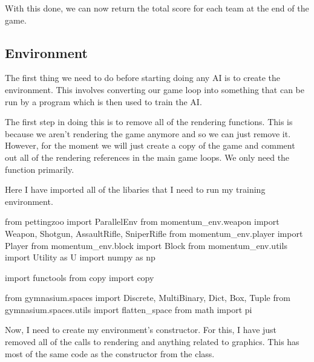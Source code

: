 \vs
With this done, we can now return the total score for each team at the end of the game.


\subsection{Environment}

The first thing we need to do before starting doing any AI is to create the environment. This involves converting our game loop into something that can be run by a program which is then used to train the AI.

\vs
The first step in doing this is to remove all of the rendering functions. This is because we aren't rendering the game anymore and so we can just remove it. However, for the moment we will just create a copy of the game and comment out all of the rendering references in the main game loops. We only need the  function primarily. 

\vs

Here I have imported all of the libaries that I need to run my training environment.

\begin{mpy}
from pettingzoo import ParallelEnv
from momentum_env.weapon import Weapon, Shotgun, AssaultRifle, SniperRifle
from momentum_env.player import Player
from momentum_env.block import Block
from momentum_env.utils import Utility as U
import numpy as np

import functools
from copy import copy

from gymnasium.spaces import Discrete, MultiBinary, Dict, Box, Tuple
from gymnasium.spaces.utils import flatten_space
from math import pi
\end{mpy}

Now, I need to create my environment's constructor. For this, I have just removed all of the calls to rendering and anything related to graphics. This has most of the same code as the constructor from the  class.

